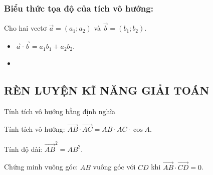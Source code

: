 \subsubsection{Biểu thức tọa độ của tích vô hướng:}
Cho hai vectơ $\overrightarrow{a}=(a_1;a_2 )$ và $\overrightarrow{b}=(b_1;b_2 )$.
\begin{itemize}
    \item [\iconMT]  $\overrightarrow{a}\cdot \overrightarrow{b}=a_1b_1+a_2b_2$.
    \item [\iconMT] 
\end{itemize}

\subsection{RÈN LUYỆN KĨ NĂNG GIẢI TOÁN}

\begin{dang}{Tính tích vô hướng bằng định nghĩa}
    \begin{listEX}[1]
        \item [\ding{172}] Tính tích vô hướng: $\overrightarrow{AB} \cdot \overrightarrow{AC} = AB \cdot AC \cdot \cos A$.
        \item [\ding{173}] Tính độ dài: $\overrightarrow{AB}^2=AB^2$.
        \item [\ding{174}] Chứng minh vuông góc: $AB$ vuông góc với $CD$ khi $\overrightarrow{AB} \cdot \overrightarrow{CD}=0$.
    \end{listEX}
\end{dang}


